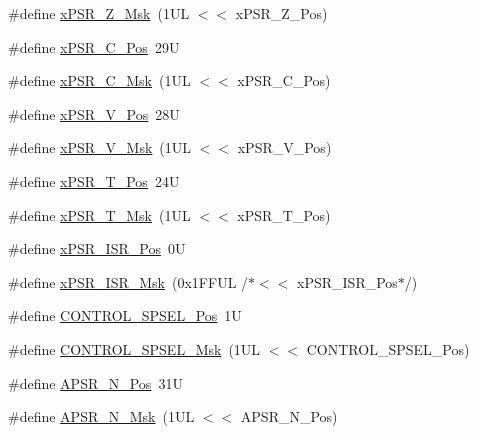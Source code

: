 \begin{DoxyCompactItemize}
\#define \mbox{\hyperlink{group___c_m_s_i_s___c_o_r_e_ga907599209fba99f579778e662021c4f2}{x\+P\+S\+R\+\_\+\+Z\+\_\+\+Msk}}~(1\+U\+L $<$$<$ x\+P\+S\+R\+\_\+\+Z\+\_\+\+Pos)
\item 
\#define \mbox{\hyperlink{group___c_m_s_i_s___c_o_r_e_ga14adb79b91f6634b351a1b57394e2db6}{x\+P\+S\+R\+\_\+\+C\+\_\+\+Pos}}~29U
\item 
\#define \mbox{\hyperlink{group___c_m_s_i_s___c_o_r_e_ga21e2497255d380f956ca0f48d11d0775}{x\+P\+S\+R\+\_\+\+C\+\_\+\+Msk}}~(1\+U\+L $<$$<$ x\+P\+S\+R\+\_\+\+C\+\_\+\+Pos)
\item 
\#define \mbox{\hyperlink{group___c_m_s_i_s___c_o_r_e_gae0cfbb394490db402623d97e6a979e00}{x\+P\+S\+R\+\_\+\+V\+\_\+\+Pos}}~28U
\item 
\#define \mbox{\hyperlink{group___c_m_s_i_s___c_o_r_e_gab07f94ed3b6ee695f5af719dc27995c2}{x\+P\+S\+R\+\_\+\+V\+\_\+\+Msk}}~(1\+U\+L $<$$<$ x\+P\+S\+R\+\_\+\+V\+\_\+\+Pos)
\item 
\#define \mbox{\hyperlink{group___c_m_s_i_s___c_o_r_e_ga98d801da9a49cda944f52aeae104dd38}{x\+P\+S\+R\+\_\+\+T\+\_\+\+Pos}}~24U
\item 
\#define \mbox{\hyperlink{group___c_m_s_i_s___c_o_r_e_ga30ae2111816e82d47636a8d4577eb6ee}{x\+P\+S\+R\+\_\+\+T\+\_\+\+Msk}}~(1\+U\+L $<$$<$ x\+P\+S\+R\+\_\+\+T\+\_\+\+Pos)
\item 
\#define \mbox{\hyperlink{group___c_m_s_i_s___c_o_r_e_ga21bff245fb1aef9683f693d9d7bb2233}{x\+P\+S\+R\+\_\+\+I\+S\+R\+\_\+\+Pos}}~0U
\item 
\#define \mbox{\hyperlink{group___c_m_s_i_s___c_o_r_e_gadf8eed87e0081dfe1ef1c78a0ea91afd}{x\+P\+S\+R\+\_\+\+I\+S\+R\+\_\+\+Msk}}~(0x1\+F\+F\+U\+L /$\ast$$<$$<$ x\+P\+S\+R\+\_\+\+I\+S\+R\+\_\+\+Pos$\ast$/)
\item 
\#define \mbox{\hyperlink{group___c_m_s_i_s___c_o_r_e_ga07eafc53e609895342c6a530e9d01310}{C\+O\+N\+T\+R\+O\+L\+\_\+\+S\+P\+S\+E\+L\+\_\+\+Pos}}~1U
\item 
\#define \mbox{\hyperlink{group___c_m_s_i_s___c_o_r_e_ga70b29840969b06909da21369b0b05b53}{C\+O\+N\+T\+R\+O\+L\+\_\+\+S\+P\+S\+E\+L\+\_\+\+Msk}}~(1\+U\+L $<$$<$ C\+O\+N\+T\+R\+O\+L\+\_\+\+S\+P\+S\+E\+L\+\_\+\+Pos)
\item 
\#define \mbox{\hyperlink{group___c_m_s_i_s___c_o_r_e_gac469528d210043c7bd3f12f0e6824766}{A\+P\+S\+R\+\_\+\+N\+\_\+\+Pos}}~31U
\item 
\#define \mbox{\hyperlink{group___c_m_s_i_s___c_o_r_e_gadbc2cf55a026f661b53fadfcf822cef1}{A\+P\+S\+R\+\_\+\+N\+\_\+\+Msk}}~(1\+U\+L $<$$<$ A\+P\+S\+R\+\_\+\+N\+\_\+\+Pos)

\end{DoxyCompactItemize}
